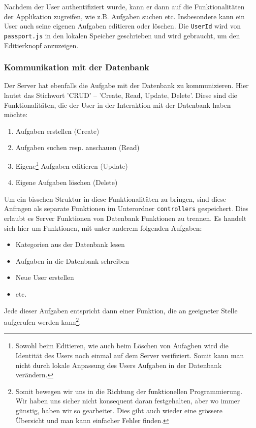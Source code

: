 Nachdem der User authentifiziert wurde, kann er dann auf die Funktionalitäten der Applikation zugreifen, wie z.B. Aufgaben suchen etc. Insbesondere kann ein User auch seine eigenen Aufgaben editieren oder löschen. Die \verb|UserId| wird von \verb|passport.js| in den lokalen Speicher geschrieben und wird gebraucht, um den Editierknopf anzuzeigen. 

\subsubsection{Kommunikation mit der Datenbank}

Der Server hat ebenfalls die Aufgabe mit der Datenbank zu kommunizieren. Hier lautet das Stichwort 'CRUD' -- 'Create, Read, Update, Delete'. Diese sind die Funktionalitäten, die der User in der Interaktion mit der Datenbank haben möchte:
\begin{enumerate}
    \item Aufgaben erstellen (Create)
    \item Aufgaben suchen resp. anschauen (Read)
    \item Eigene\footnote{Sowohl beim Editieren, wie auch beim Löschen von Aufagben wird die Identität des Users noch einmal auf dem Server verifiziert. Somit kann man nicht durch lokale Anpassung des Users Aufgaben in der Datenbank verändern.} Aufgaben editieren (Update)
    \item Eigene Aufgaben löschen (Delete)
\end{enumerate}

Um ein bisschen Struktur in diese Funktionalitäten zu bringen, sind diese Anfragen als separate Funktionen im Unterordner \verb|controllers| gespeichert. Dies erlaubt es Server Funktionen von Datenbank Funktionen zu trennen. Es handelt sich hier um Funktionen, mit unter anderem folgenden Aufgaben:
\begin{itemize}
    \item Kategorien aus der Datenbank lesen
    \item Aufgaben in die Datenbank schreiben
    \item Neue User erstellen
    \item etc.
\end{itemize}

Jede dieser Aufgaben entspricht dann einer Funktion, die an geeigneter Stelle aufgerufen werden kann\footnote{Somit bewegen wir uns in die Richtung der funktionellen Programmierung. Wir haben uns sicher nicht konsequent daran festgehalten, aber wo immer günstig, haben wir so gearbeitet. Dies gibt auch wieder eine grössere Übersicht und man kann einfacher Fehler finden.}. 

